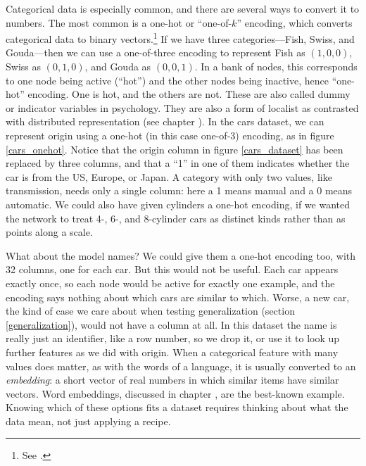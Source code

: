 
Categorical data is especially common, and there are several ways to convert it to numbers. The most common is a one-hot or ``one-of-$k$'' encoding, which converts categorical data to binary vectors.\footnote{See .} If we have three categories---Fish, Swiss, and Gouda---then we can use a one-of-three encoding to represent Fish as $(1,0,0)$, Swiss as $(0,1,0)$, and Gouda as $(0,0,1)$. In a bank of nodes, this corresponds to one node being active (``hot'') and the other nodes being inactive, hence ``one-hot'' encoding. One is hot, and the others are not. These are also called dummy or indicator variables in psychology. They are also a form of localist as contrasted with distributed representation (see chapter ). In the cars dataset, we can represent origin using a one-hot (in this case one-of-3) encoding, as in figure \ref{cars_onehot}. Notice that the origin column in figure \ref{cars_dataset} has been replaced by three columns, and that a ``1'' in one of them indicates whether the car is from the US, Europe, or Japan. A category with only two values, like transmission, needs only a single column: here a 1 means manual and a 0 means automatic. We could also have given cylinders a one-hot encoding, if we wanted the network to treat 4-, 6-, and 8-cylinder cars as distinct kinds rather than as points along a scale.

What about the model names? We could give them a one-hot encoding too, with 32 columns, one for each car. But this would not be useful. Each car appears exactly once, so each node would be active for exactly one example, and the encoding says nothing about which cars are similar to which. Worse, a new car, the kind of case we care about when testing generalization (section \ref{generalization}), would not have a column at all. In this dataset the name is really just an identifier, like a row number, so we drop it, or use it to look up further features as we did with origin. When a categorical feature with many values does matter, as with the words of a language, it is usually converted to an \emph{embedding}: a short vector of real numbers in which similar items have similar vectors. Word embeddings, discussed in chapter , are the best-known example. Knowing which of these options fits a dataset requires thinking about what the data mean, not just applying a recipe.

